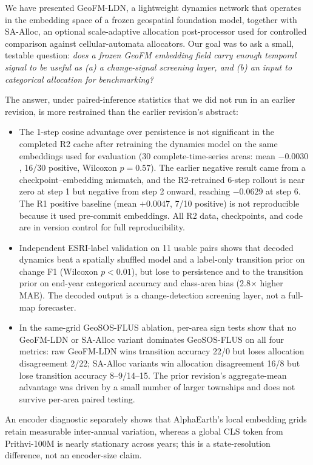 \documentclass{article}
\begin{document}
We have presented GeoFM-LDN, a lightweight dynamics network that operates in the embedding space of a frozen geospatial foundation model, together with SA-Alloc, an optional scale-adaptive allocation post-processor used for controlled comparison against cellular-automata allocators. Our goal was to ask a small, testable question: \emph{does a frozen GeoFM embedding field carry enough temporal signal to be useful as (a) a change-signal screening layer, and (b) an input to categorical allocation for benchmarking?}

The answer, under paired-inference statistics that we did not run in an earlier revision, is more restrained than the earlier revision's abstract:

\begin{itemize}
\item The 1-step cosine advantage over persistence is not significant in the completed R2 cache after retraining the dynamics model on the same embeddings used for evaluation (30 complete-time-series areas: mean $-0.0030$, 16/30 positive, Wilcoxon $p=0.57$). The earlier negative result came from a checkpoint--embedding mismatch, and the R2-retrained 6-step rollout is near zero at step 1 but negative from step 2 onward, reaching $-0.0629$ at step 6. The R1 positive baseline (mean $+0.0047$, 7/10 positive) is not reproducible because it used pre-commit embeddings. All R2 data, checkpoints, and code are in version control for full reproducibility.
\item Independent ESRI-label validation on 11 usable pairs shows that decoded dynamics beat a spatially shuffled model and a label-only transition prior on change F1 (Wilcoxon $p<0.01$), but lose to persistence and to the transition prior on end-year categorical accuracy and class-area bias (2.8$\times$ higher MAE). The decoded output is a change-detection screening layer, not a full-map forecaster.
\item In the same-grid GeoSOS-FLUS ablation, per-area sign tests show that no GeoFM-LDN or SA-Alloc variant dominates GeoSOS-FLUS on all four metrics: raw GeoFM-LDN wins transition accuracy 22/0 but loses allocation disagreement 2/22; SA-Alloc variants win allocation disagreement 16/8 but lose transition accuracy 8--9/14--15. The prior revision's aggregate-mean advantage was driven by a small number of larger townships and does not survive per-area paired testing.
\end{itemize}

An encoder diagnostic separately shows that AlphaEarth's local embedding grids retain measurable inter-annual variation, whereas a global CLS token from Prithvi-100M is nearly stationary across years; this is a state-resolution difference, not an encoder-size claim.
\end{document}
